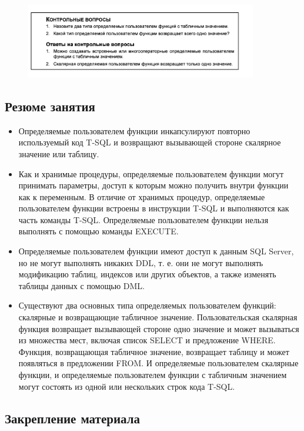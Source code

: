 \begin{figure}[h!]
	\begin{center}
		\includegraphics[width=0.9\textwidth]{img/control40.png}
	\end{center}
	\captionsetup{justification=centering}
\end{figure}


\subsection*{Резюме занятия}
\begin{itemize}
	\item Определяемые пользователем функции инкапсулируют повторно используемый код T-SQL и возвращают вызывающей стороне скалярное значение или
	таблицу. 
	\item Как и хранимые процедуры, определяемые пользователем функции могут принимать параметры, доступ к которым можно получить внутри функции как к переменным. В отличие от хранимых процедур, определяемые пользователем
	функции встроены в инструкции T-SQL и выполняются как часть команды
	T-SQL. Определяемые пользователем функции нельзя выполнять с помощью
	команды EXECUTE. 
	\item Определяемые пользователем функции имеют доступ к данным SQL Server, но
	не могут выполнять никаких DDL, т. е. они не могут выполнять модификацию
	таблиц, индексов или других объектов, а также изменять таблицы данных с помощью DML. 
	\item Существуют два основных типа определяемых пользователем функций: скалярные и возвращающие табличное значение. Пользовательская скалярная функция
	возвращает вызывающей стороне одно значение и может вызываться из множества мест, включая список SELECT и предложение WHERE. Функция, возвращающая
	табличное значение, возвращает таблицу и может появляться в предложении
	FROM. И определяемые пользователем скалярные функции, и определяемые пользователем функции с табличным значением могут состоять из одной или нескольких строк кода T-SQL. 
\end{itemize}


\subsection*{Закрепление материала}

